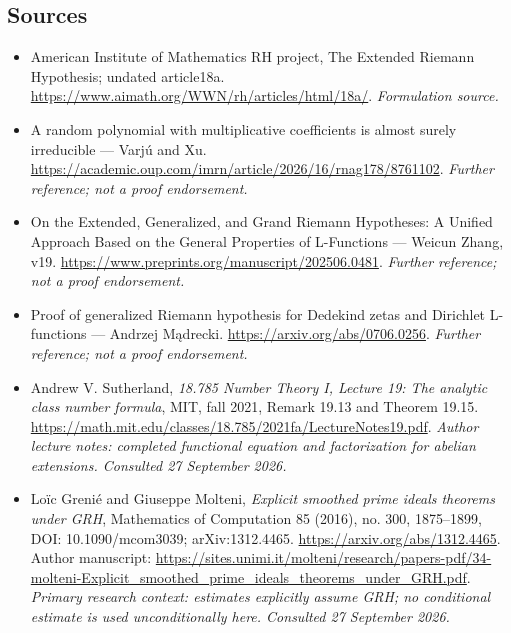 \documentclass[11pt]{article}
\begin{document}
\subsection{Sources}
\begin{itemize}
\item[S1]American Institute of Mathematics RH project, The Extended Riemann Hypothesis; undated article18a.
\url{https://www.aimath.org/WWN/rh/articles/html/18a/}.
\textit{Formulation source.}
\item[S2]A random polynomial with multiplicative coefficients is almost surely irreducible — Varjú and Xu.
\url{https://academic.oup.com/imrn/article/2026/16/rnag178/8761102}.
\textit{Further reference; not a proof endorsement.}
\item[S3]On the Extended, Generalized, and Grand Riemann Hypotheses: A Unified Approach Based on the General Properties of L-Functions — Weicun Zhang, v19.
\url{https://www.preprints.org/manuscript/202506.0481}.
\textit{Further reference; not a proof endorsement.}
\item[S4]Proof of generalized Riemann hypothesis for Dedekind zetas and Dirichlet L-functions — Andrzej Mądrecki.
\url{https://arxiv.org/abs/0706.0256}.
\textit{Further reference; not a proof endorsement.}

\item[E1]Andrew V. Sutherland, \emph{18.785 Number Theory I, Lecture 19:
The analytic class number formula}, MIT, fall 2021,
Remark 19.13 and Theorem 19.15.
\url{https://math.mit.edu/classes/18.785/2021fa/LectureNotes19.pdf}.
\textit{Author lecture notes: completed functional equation and factorization
for abelian extensions. Consulted 27 September 2026.}
\item[E2]Lo\"ic Greni\'e and Giuseppe Molteni,
\emph{Explicit smoothed prime ideals theorems under GRH},
Mathematics of Computation 85 (2016), no. 300, 1875--1899,
DOI: 10.1090/mcom3039; arXiv:1312.4465.
\url{https://arxiv.org/abs/1312.4465}.
Author manuscript:
\url{https://sites.unimi.it/molteni/research/papers-pdf/34-molteni-Explicit_smoothed_prime_ideals_theorems_under_GRH.pdf}.
\textit{Primary research context: estimates explicitly assume GRH;
no conditional estimate is used unconditionally here.
Consulted 27 September 2026.}
\end{itemize}
\end{document}
